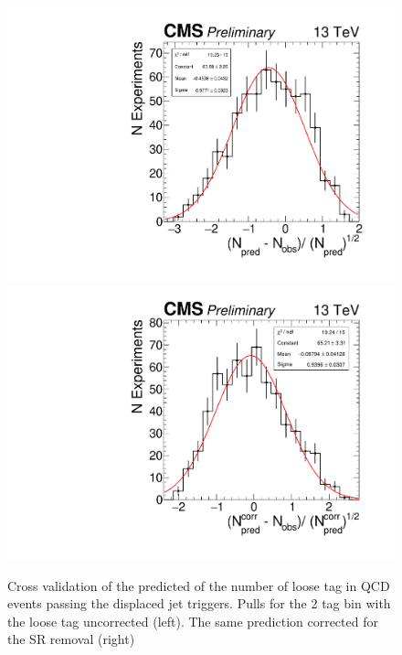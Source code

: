 \begin{figure}
\begin{center}
\includegraphics[width=.45\textwidth]{figures/an/ANALYSIS/pulls/qcd_loose_uncorrected_2tag.pdf}
\includegraphics[width=.45\textwidth]{figures/an/ANALYSIS/pulls/qcd_loose_corrected_2tag.pdf}
\caption{Cross validation of the predicted of the number of loose tag in QCD events passing the displaced jet triggers. Pulls for the 2 tag bin with the loose tag uncorrected (left). The same prediction corrected for the SR removal (right) \label{fig:qcd_2tag_xval}}
\end{center}
\end{figure}


